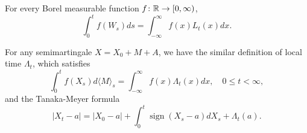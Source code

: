 \begin{rmk}
    For every Borel measurable function $f \colon \mathbb{R} \rightarrow [0,\infty)$,
    \begin{equation*}
        \int_0^t f(W_s)ds = \int_{-\infty}^\infty f(x)L_t(x)dx.
    \end{equation*}
\end{rmk}
\begin{rmk}
    For any semimartingale $X = X_0 + M + A$, we have the similar definition of local time $\Lambda_t$, which satisfies
    \begin{equation*}
        \int_0^t f\left(X_s\right) d\langle M\rangle_s=\int_{-\infty}^{\infty} f(x) \Lambda_t(x) d x, \quad 0 \leq t<\infty,
    \end{equation*}
    and the Tanaka-Meyer formula
    \begin{equation*}
        \left|X_t-a\right|=\left|X_0-a\right|+\int_0^t \operatorname{sign}\left(X_s-a\right) d X_s+\Lambda_t(a).
    \end{equation*}
\end{rmk}





























